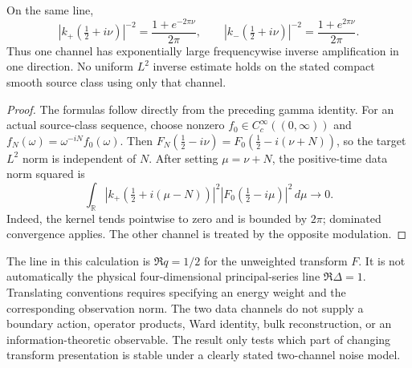 \begin{proposition}
\label{prop:frameworkonechannel}
On the same line,
\[
 |k_+(\tfrac12+i\nu)|^{-2}
   =\frac{1+e^{-2\pi\nu}}{2\pi},\qquad
 |k_-(\tfrac12+i\nu)|^{-2}
   =\frac{1+e^{2\pi\nu}}{2\pi}.
\]
Thus one channel has exponentially large frequencywise inverse
amplification in one direction. No uniform $L^2$ inverse estimate
holds on the stated compact smooth source class using only that channel.
\end{proposition}
\begin{proof}
The formulas follow directly from the preceding gamma identity.
For an actual source-class sequence, choose nonzero
$f_0\in C_c^\infty((0,\infty))$ and
$f_N(\omega)=\omega^{-iN}f_0(\omega)$.
Then $F_N(\tfrac12-i\nu)=F_0(\tfrac12-i(\nu+N))$,
so the target $L^2$ norm is independent of $N$.
After setting $\mu=\nu+N$, the positive-time data norm squared is
\[
 \int_{\mathbb R}|k_+(\tfrac12+i(\mu-N))|^2
                 |F_0(\tfrac12-i\mu)|^2\,d\mu\longrightarrow0.
\]
Indeed, the kernel tends pointwise to zero and is bounded by $2\pi$;
dominated convergence applies. The other channel is treated by the
opposite modulation.
\end{proof}

The line in this calculation is $\Re q=1/2$ for the unweighted
transform $F$. It is not automatically the physical four-dimensional
principal-series line $\Re\Delta=1$. Translating conventions requires
specifying an energy weight and the corresponding observation norm.
The two data channels do not supply a boundary action, operator products,
Ward identity, bulk reconstruction, or an information-theoretic observable.
The result only tests which part of changing transform presentation
is stable under a clearly stated two-channel noise model.
